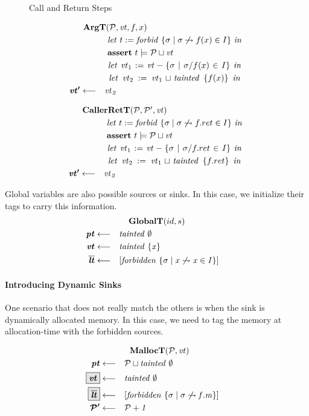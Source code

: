 \documentclass[acmsmall,review,anonymous]{acmart}\settopmatter{printfolios=true,printccs=false,printacmref=false}
\begin{document}
\begin{figure}
  \callstep
  \returnstep
  \caption{Call and Return Steps}
  \label{fig:callretsteps}
\end{figure}
  
\begin{minipage}[t]{.49\textwidth}
  \[\begin{aligned}
  \truledef{\argt}
  \letin{t := \mathit{forbid} ~ \{\sigma \mid \sigma \not \rightsquigarrow f(x) \in I\}}
  \assert{t \models \PCT \sqcup \vt}
  \letin{\vt_1 := \vt - \{\sigma \mid \sigma / f(x) \in I \}}
  \letin{\vt_2 := \vt_1 \sqcup \mathit{tainted} ~ \{f(x)\}}
  \settag{\vt'}{\vt_2}
  \end{aligned}\]
\end{minipage}
\begin{minipage}[t]{.49\textwidth}            
  \[\begin{aligned}
  \truledef{\callerrett}
  \letin{t := \mathit{forbid} ~ \{\sigma \mid \sigma \not \rightsquigarrow f.ret \in I\}}
  \assert{t \models \PCT \sqcup \vt}
  \letin{\vt_1 := \vt - \{\sigma \mid \sigma / f.ret \in I \}}
  \letin{\vt_2 := \vt_1 \sqcup \mathit{tainted} ~ \{f.ret\}}
  \settag{\vt'}{\vt_2}
  \end{aligned}\]
\end{minipage}

Global variables are also possible sources or sinks. In this case, we initialize their
tags to carry this information.
\[\begin{aligned}
\truledef{\globalt}
\settag{\pt}{\mathit{tainted} ~ \emptyset}
\settag{\vt}{\mathit{tainted} ~ \{x\}}
\settag{\overline{\lt}}{\left[\mathit{forbidden} ~ \{\sigma \mid x \not \rightsquigarrow x \in I\}\right]}
\end{aligned}\]

\paragraph{Introducing Dynamic Sinks}

One scenario that does not really match the others is when the sink is dynamically allocated
memory. In this case, we need to tag the memory at allocation-time with the forbidden
sources.

\[\begin{aligned}
\truledef{\malloct}
\settag{\pt}{\PCT \sqcup \mathit{tainted} ~ \emptyset}
\settagopt{\vt}{\mathit{tainted} ~ \emptyset}
\settagopt{\overline{\lt}}{\left[\mathit{forbidden} ~ \{\sigma \mid \sigma \not \rightsquigarrow f.m\} \right]}
\settag{\PCT'}{\PCT + 1}
\end{aligned}\]
\end{document}
